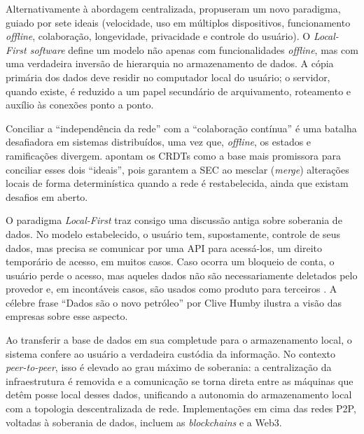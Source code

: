 Alternativamente à abordagem centralizada,  propuseram um novo paradigma, guiado por sete ideais (velocidade, uso em
múltiplos dispositivos, funcionamento \textit{offline}, colaboração, longevidade, privacidade e controle do usuário). O \textit{Local-First software} define
um modelo não apenas com funcionalidades \textit{offline}, mas com uma verdadeira inversão de hierarquia no armazenamento de dados. A
cópia primária dos dados deve residir no computador local do usuário; o servidor, quando existe, é reduzido a um papel secundário
de arquivamento, roteamento e auxílio às conexões ponto a ponto.

Conciliar a ``independência da rede'' com a ``colaboração contínua'' é uma batalha desafiadora em sistemas distribuídos, uma
vez que, \textit{offline}, os estados e ramificações divergem.  apontam os CRDTs como a base mais promissora para
conciliar esses dois ``ideais'', pois garantem a SEC ao mesclar (\textit{merge}) alterações locais de forma determinística quando
a rede é restabelecida, ainda que existam desafios em aberto.

O paradigma \textit{Local-First} traz consigo uma discussão antiga sobre soberania de dados. No modelo estabelecido, o usuário tem, supostamente,
controle de seus dados, mas precisa se comunicar por uma API para acessá-los, um direito temporário de acesso, em muitos casos. Caso ocorra um
bloqueio de conta, o usuário perde o acesso, mas aqueles dados não são necessariamente deletados pelo provedor e, em incontáveis casos, são usados
como produto para terceiros \cite{zuboff2019}. A célebre frase ``Dados são o novo petróleo'' por Clive Humby \cite{palmer2006} ilustra a visão
das empresas sobre esse aspecto.

Ao transferir a base de dados em sua completude para o armazenamento local, o sistema confere ao usuário a verdadeira custódia da informação. No
contexto \textit{peer-to-peer}, isso é elevado ao grau máximo de soberania: a centralização da infraestrutura é removida e a comunicação se torna direta
entre as máquinas que detêm posse local desses dados, unificando a autonomia do armazenamento local com a topologia descentralizada de rede. Implementações
em cima das redes P2P, voltadas à soberania de dados, incluem as \textit{blockchains} e a Web3.
